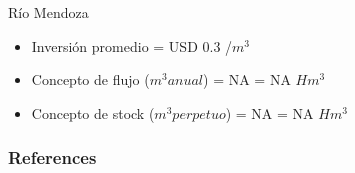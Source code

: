 \documentclass{beamer}\usepackage[]{graphicx}\usepackage[]{color}
\begin{document}
\begin{frame}{Río Mendoza}
  \begin{itemize}
  \item Inversión promedio = USD 
0.3
/$m^3$

\pause \item Concepto de flujo ($m^3 anual$) = 
NA
=
NA
$Hm^3$
\pause \item Concepto de stock ($m^3 perpetuo$) = 
NA
=
NA
$Hm^3$
\end{itemize}
\end{frame}




\begin{frame}[allowframebreaks]
        \frametitle{References}
        \begin{scriptsize}
       
        \end{scriptsize}
\end{frame}
\end{document}
